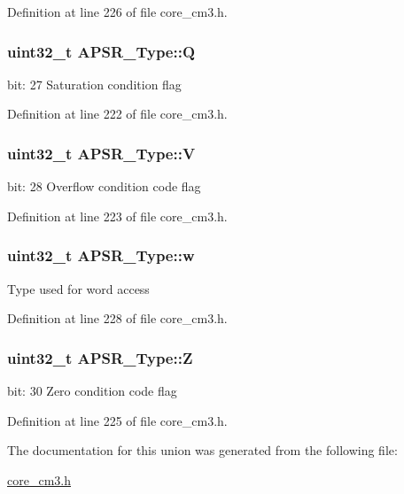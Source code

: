 Definition at line 226 of file core\+\_\+cm3.\+h.

\subsubsection[{\texorpdfstring{Q}{Q}}]{\setlength{\rightskip}{0pt plus 5cm}uint32\+\_\+t A\+P\+S\+R\+\_\+\+Type\+::Q}\hypertarget{unionAPSR__Type_a22d10913489d24ab08bd83457daa88de}{}\label{unionAPSR__Type_a22d10913489d24ab08bd83457daa88de}
bit\+: 27 Saturation condition flag 

Definition at line 222 of file core\+\_\+cm3.\+h.

\subsubsection[{\texorpdfstring{V}{V}}]{\setlength{\rightskip}{0pt plus 5cm}uint32\+\_\+t A\+P\+S\+R\+\_\+\+Type\+::V}\hypertarget{unionAPSR__Type_a8004d224aacb78ca37774c35f9156e7e}{}\label{unionAPSR__Type_a8004d224aacb78ca37774c35f9156e7e}
bit\+: 28 Overflow condition code flag 

Definition at line 223 of file core\+\_\+cm3.\+h.

\subsubsection[{\texorpdfstring{w}{w}}]{\setlength{\rightskip}{0pt plus 5cm}uint32\+\_\+t A\+P\+S\+R\+\_\+\+Type\+::w}\hypertarget{unionAPSR__Type_ae4c2ef8c9430d7b7bef5cbfbbaed3a94}{}\label{unionAPSR__Type_ae4c2ef8c9430d7b7bef5cbfbbaed3a94}
Type used for word access 

Definition at line 228 of file core\+\_\+cm3.\+h.

\subsubsection[{\texorpdfstring{Z}{Z}}]{\setlength{\rightskip}{0pt plus 5cm}uint32\+\_\+t A\+P\+S\+R\+\_\+\+Type\+::Z}\hypertarget{unionAPSR__Type_a3b04d58738b66a28ff13f23d8b0ba7e5}{}\label{unionAPSR__Type_a3b04d58738b66a28ff13f23d8b0ba7e5}
bit\+: 30 Zero condition code flag 

Definition at line 225 of file core\+\_\+cm3.\+h.



The documentation for this union was generated from the following file\+:\begin{DoxyCompactItemize}
\item 
\hyperlink{core__cm3_8h}{core\+\_\+cm3.\+h}\end{DoxyCompactItemize}
